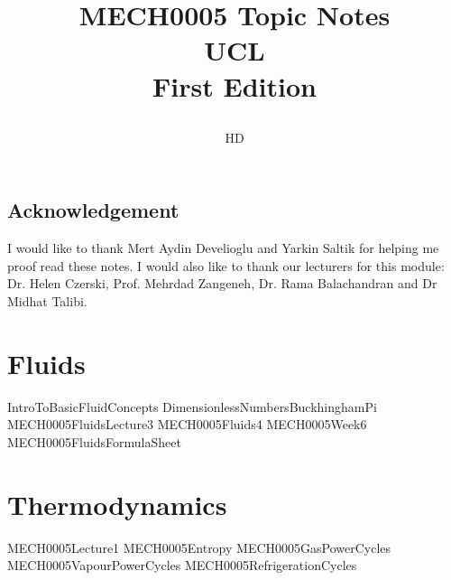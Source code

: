 \documentclass[12pt,a4paper, twoside]{book}
\numberwithin{equation}{section}
\begin{document}
\title{
  {MECH0005 Topic Notes}\\
  {\large UCL}\\
  {\large First Edition}
  \author{HD}
}
\maketitle
{\pagestyle{plain}
\tableofcontents
\cleardoublepage}
\section*{Acknowledgement}
I would like to thank Mert Aydin Develioglu and Yarkin Saltik for helping me proof read these notes. I would also like to thank our lecturers for this module: Dr. Helen Czerski, Prof. Mehrdad Zangeneh, Dr. Rama Balachandran and Dr Midhat Talibi. \thispagestyle{plain}
\chapter{Fluids}
{IntroToBasicFluidConcepts}
{DimensionlessNumbersBuckhinghamPi}
{MECH0005FluidsLecture3}
{MECH0005Fluids4}
{MECH0005Week6}
{MECH0005FluidsFormulaSheet}
\chapter{Thermodynamics}
{MECH0005Lecture1}
{MECH0005Entropy}
{MECH0005GasPowerCycles}
{MECH0005VapourPowerCycles}
{MECH0005RefrigerationCycles}
\listoffigures
\end{document}
